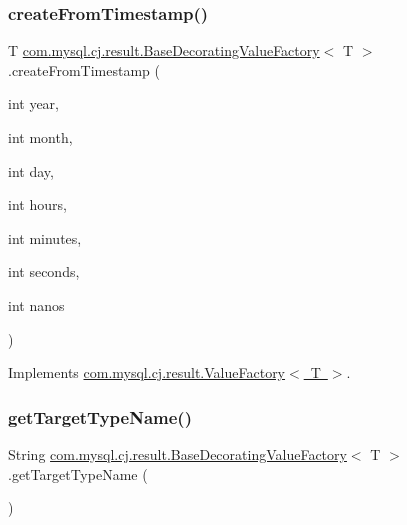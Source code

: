 \subsubsection{\texorpdfstring{create\+From\+Timestamp()}{createFromTimestamp()}}
{\footnotesize\ttfamily T \mbox{\hyperlink{classcom_1_1mysql_1_1cj_1_1result_1_1_base_decorating_value_factory}{com.\+mysql.\+cj.\+result.\+Base\+Decorating\+Value\+Factory}}$<$ T $>$.create\+From\+Timestamp (\begin{DoxyParamCaption}\item[{int}]{year,  }\item[{int}]{month,  }\item[{int}]{day,  }\item[{int}]{hours,  }\item[{int}]{minutes,  }\item[{int}]{seconds,  }\item[{int}]{nanos }\end{DoxyParamCaption})}



Implements \mbox{\hyperlink{interfacecom_1_1mysql_1_1cj_1_1result_1_1_value_factory_accbdc6c6970a22e40a0b1d72213334e6}{com.\+mysql.\+cj.\+result.\+Value\+Factory$<$ T $>$}}.

\mbox{\label{classcom_1_1mysql_1_1cj_1_1result_1_1_base_decorating_value_factory_a50680123fa3626dd2a9fbb6e4fd01f0b}} 
\subsubsection{\texorpdfstring{get\+Target\+Type\+Name()}{getTargetTypeName()}}
{\footnotesize\ttfamily String \mbox{\hyperlink{classcom_1_1mysql_1_1cj_1_1result_1_1_base_decorating_value_factory}{com.\+mysql.\+cj.\+result.\+Base\+Decorating\+Value\+Factory}}$<$ T $>$.get\+Target\+Type\+Name (\begin{DoxyParamCaption}{ }\end{DoxyParamCaption})}



